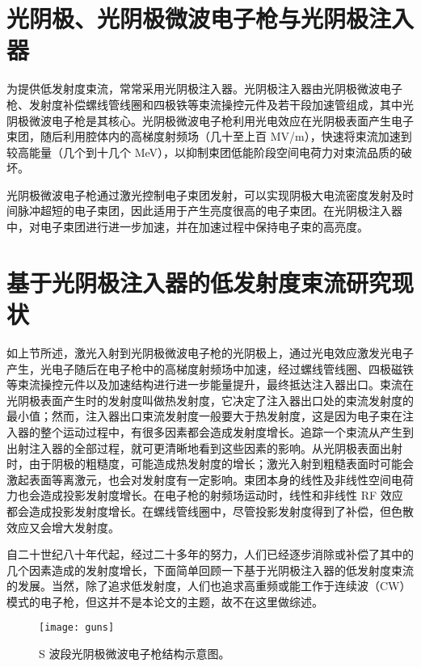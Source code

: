 \section{光阴极、光阴极微波电子枪与光阴极注入器}
为提供低发射度束流，常常采用光阴极注入器。光阴极注入器由光阴极微波电子枪、发射度补偿螺线管线圈和四极铁等束流操控元件及若干段加速管组成，其中光阴极微波电子枪是其核心。光阴极微波电子枪利用光电效应在光阴极表面产生电子束团，随后利用腔体内的高梯度射频场（几十至上百 MV/m），快速将束流加速到较高能量（几个到十几个 MeV），以抑制束团低能阶段空间电荷力对束流品质的破坏。

光阴极微波电子枪通过激光控制电子束团发射，可以实现阴极大电流密度发射及时间脉冲超短的电子束团，因此适用于产生亮度很高的电子束团。在光阴极注入器中，对电子束团进行进一步加速，并在加速过程中保持电子束的高亮度。

\section{基于光阴极注入器的低发射度束流研究现状}
如上节所述，激光入射到光阴极微波电子枪的光阴极上，通过光电效应激发光电子产生，光电子随后在电子枪中的高梯度射频场中加速，经过螺线管线圈、四极磁铁等束流操控元件以及加速结构进行进一步能量提升，最终抵达注入器出口。束流在光阴极表面产生时的发射度叫做热发射度，它决定了注入器出口处的束流发射度的最小值；然而，注入器出口束流发射度一般要大于热发射度，这是因为电子束在注入器的整个运动过程中，有很多因素都会造成发射度增长\cite{chao1980beam,Carlsten:1989aa,OShea:1996aa,OShea:1998aa,carlsten1995emittance}。追踪一个束流从产生到出射注入器的全部过程，就可更清晰地看到这些因素的影响。从光阴极表面出射时，由于阴极的粗糙度，可能造成热发射度的增长\cite{Bradley:1977aa}；激光入射到粗糙表面时可能会激起表面等离激元\cite{Ritchie:1957aa}，也会对发射度有一定影响。束团本身的线性及非线性空间电荷力也会造成投影发射度增长\cite{Kim:1989ab}。在电子枪的射频场运动时，线性和非线性 RF 效应都会造成投影发射度增长\cite{reiser1991free}。在螺线管线圈中，尽管投影发射度得到了补偿\cite{Carlsten:1989aa,Serafini:1997ab}，但色散效应又会增大发射度\cite{yang2002experimental,Dowell:2010ab}。

自二十世纪八十年代起，经过二十多年的努力，人们已经逐步消除或补偿了其中的几个因素造成的发射度增长，下面简单回顾一下基于光阴极注入器的低发射度束流的发展。当然，除了追求低发射度，人们也追求高重频\cite{Petrarca:2010aa}或能工作于连续波（CW）模式的电子枪\cite{sannibale2012advanced,Filippetto:2013aa}，但这并不是本论文的主题，故不在这里做综述。

\begin{figure}[htbp]
\centering
\texttt{[image: guns]}
\caption{\label{fig:guns} S 波段光阴极微波电子枪结构示意图\cite{Qian:2012aa}。}
\end{figure}

